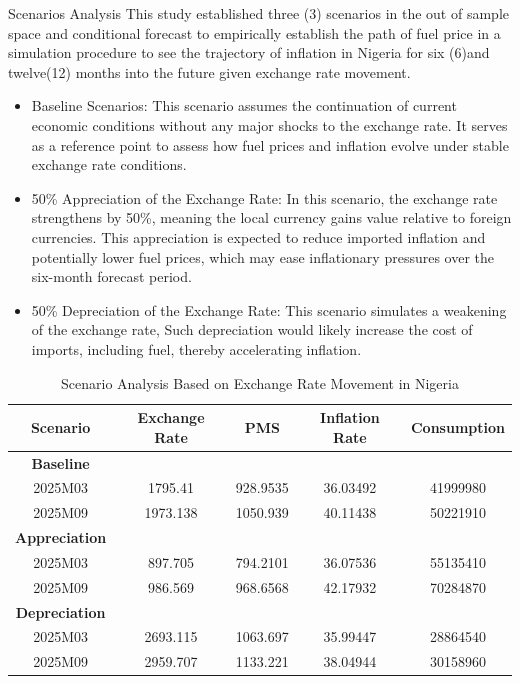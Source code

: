 \documentclass{beamer}
\begin{document}
{\begin{frame}{Scenarios Analysis}
This study established three (3) scenarios in the out of sample space and conditional forecast to empirically establish the path of fuel price in a simulation procedure to see the trajectory of inflation in Nigeria
for six (6)and twelve(12) months into the future given exchange rate movement.
\begin{itemize}
\item Baseline Scenarios:
This scenario assumes the continuation of current economic conditions without any major shocks to the exchange rate. It serves as a reference point to assess how fuel prices and inflation evolve under stable exchange rate conditions.
\item  50\% Appreciation of the Exchange Rate:
In this scenario, the exchange rate strengthens by 50\%, meaning the local currency gains value relative to foreign currencies. This appreciation is expected to reduce imported inflation and potentially lower fuel prices, which may ease inflationary pressures over the six-month forecast period.
\item 50\% Depreciation of the Exchange Rate:
This scenario simulates a weakening of the exchange rate, Such depreciation would likely increase the cost of imports, including fuel, thereby accelerating inflation. 
\end{itemize}
\end{frame}
\begin{frame}
 \begin{table}[ht]
\centering
\caption{Scenario Analysis Based on Exchange Rate Movement in Nigeria}
 \resizebox{\textwidth}{!}
{
\begin{tabular}{|c|c|c|c|c|}
\hline
\textbf{Scenario} & \textbf{Exchange Rate} & \textbf{PMS} & \textbf{Inflation Rate} & \textbf{Consumption} \\
\hline
\textbf{Baseline} & & & & \\
2025M03 & 1795.41 & 928.9535 & 36.03492 & 41999980 \\
2025M09 & 1973.138 & 1050.939 & 40.11438 & 50221910 \\
\hline
\textbf{Appreciation} & & & & \\
2025M03 & 897.705 & 794.2101 & 36.07536 & 55135410 \\
2025M09 & 986.569 & 968.6568 & 42.17932 & 70284870 \\
\hline
\textbf{Depreciation} & & & & \\
2025M03 & 2693.115 & 1063.697 & 35.99447 & 28864540 \\
2025M09 & 2959.707 & 1133.221 & 38.04944 & 30158960 \\
\hline
\end{tabular}
}


\end{table}
\end{frame}}
\end{document}
